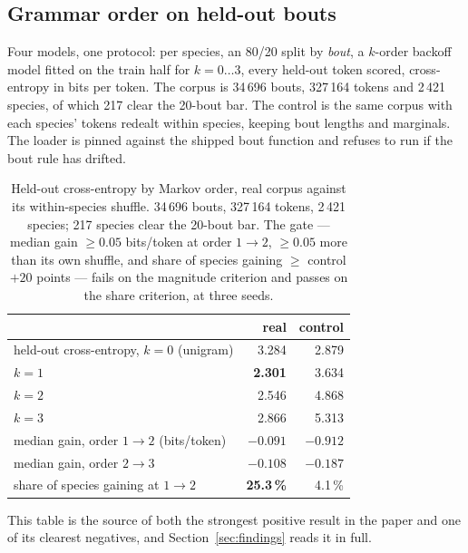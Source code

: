 \documentclass[10pt,twocolumn,a4paper]{article}
\begin{document}
\subsection{Grammar order on held-out bouts}

Four models, one protocol: per species, an 80/20 split by \emph{bout}, a $k$-order backoff
model fitted on the train half for $k = 0 \ldots 3$, every held-out token scored,
cross-entropy in bits per token. The corpus is 34\,696 bouts, 327\,164 tokens and 2\,421
species, of which 217 clear the 20-bout bar. The control is the same corpus with each
species' tokens redealt within species, keeping bout lengths and marginals. The loader is
pinned against the shipped bout function and refuses to run if the bout rule has drifted.

\begin{table}[t]
\centering
\small
\caption{Held-out cross-entropy by Markov order, real corpus against its within-species
shuffle. 34\,696 bouts, 327\,164 tokens, 2\,421 species; 217 species clear the 20-bout bar.
The gate --- median gain $\ge 0.05$ bits/token at order $1 \to 2$, $\ge 0.05$ more than its
own shuffle, and share of species gaining $\ge$ control $+ 20$ points --- fails on the
magnitude criterion and passes on the share criterion, at three seeds.}
\label{tab:orders}
\begin{tabular}{L{7.4cm} r r}
\toprule
& real & control \\
\midrule
held-out cross-entropy, $k = 0$ (unigram) & 3.284 & 2.879 \\
$k = 1$ & \textbf{2.301} & 3.634 \\
$k = 2$ & 2.546 & 4.868 \\
$k = 3$ & 2.866 & 5.313 \\
\midrule
median gain, order $1 \to 2$ (bits/token) & $\mathbf{-0.091}$ & $-0.912$ \\
median gain, order $2 \to 3$ & $-0.108$ & $-0.187$ \\
share of species gaining at $1 \to 2$ & \textbf{25.3\,\%} & 4.1\,\% \\
\bottomrule
\end{tabular}
\end{table}

This table is the source of both the strongest positive result in the paper and one of its
clearest negatives, and Section~\ref{sec:findings} reads it in full.
\end{document}
